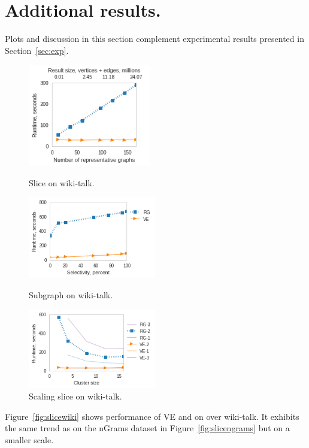 \section{Additional results.}
\label{sec:app2}

Plots and discussion in this section complement experimental results
presented in Section~\ref{sec:exp}.

\begin{figure}
\begin{minipage}[b]{2.2in}
\centering
\includegraphics[width=2.1in]{figs/slice_wikitalk_build13.png}
\caption{Slice on wiki-talk.}
\label{fig:slicewiki}
\end{minipage}
\begin{minipage}[b]{2.2in}
\centering
\includegraphics[width=2.2in]{figs/subgraph_wikitalk_build13.png}
\caption{Subgraph on wiki-talk.}
\label{fig:subgraphwiki}
\end{minipage}
\begin{minipage}[b]{2.2in}
\centering
\includegraphics[width=2.2in]{figs/slice_wikitalk_scale_build13.png}
\caption{Scaling slice on wiki-talk.}
\label{fig:slicescale}
\end{minipage}
\end{figure}

Figure~\ref{fig:slicewiki} shows performance of VE and \sg
on  over wiki-talk.  It exhibits the same trend as on the
nGrams dataset in Figure~\ref{fig:slicengrams} but on a smaller scale.

